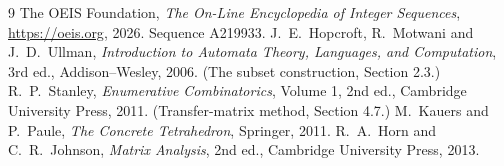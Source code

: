 \documentclass[11pt,a4paper]{article}
\theoremstyle{plain}
\theoremstyle{definition}
\begin{document}
\begin{thebibliography}{9}
 The OEIS Foundation, \emph{The On-Line Encyclopedia of Integer
Sequences}, \url{https://oeis.org}, 2026. Sequence A219933.
 J.~E.~Hopcroft, R.~Motwani and J.~D.~Ullman, \emph{Introduction to Automata
Theory, Languages, and Computation}, 3rd ed., Addison--Wesley, 2006. (The subset
construction, Section 2.3.)
 R.~P.~Stanley, \emph{Enumerative Combinatorics}, Volume 1, 2nd ed.,
Cambridge University Press, 2011. (Transfer-matrix method, Section 4.7.)
 M.~Kauers and P.~Paule, \emph{The Concrete Tetrahedron}, Springer, 2011.
 R.~A.~Horn and C.~R.~Johnson, \emph{Matrix Analysis}, 2nd ed., Cambridge
University Press, 2013.
\end{thebibliography}
\end{document}

